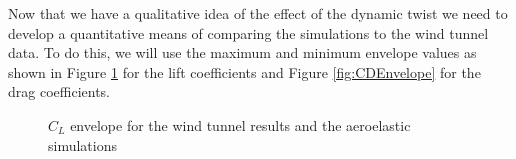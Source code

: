 \documentclass[11pt]{ucthesis}
\begin{document}
Now that we have a qualitative idea of the effect of the dynamic twist we need to develop a quantitative means of comparing the simulations to the wind tunnel data. To do this, we will use the maximum and minimum envelope values as shown in Figure \ref{fig:CLEnvelope} for the lift coefficients and Figure \ref{fig:CDEnvelope} for the drag coefficients. 

\begin{figure}[thpb]
\hfill
{}
\hfill
{}
\hfill
\caption{$C_L$ envelope for the wind tunnel results and the aeroelastic simulations}
\label{fig:CLEnvelope}
\end{figure}
\end{document}
